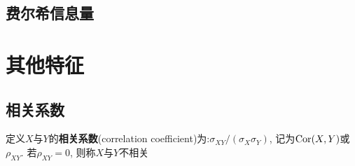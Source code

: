 \subsection{费尔希信息量}



\section{其他特征}

\subsection{相关系数}

\begin{definition}
    定义$X$与$Y$的\textbf{相关系数}(correlation coefficient)为:$\sigma_{XY}/(\sigma_{X}\sigma_{Y})$, 记为$\operatorname{Cor}(X,Y)$或$\rho_{XY}$. 若$\rho_{XY}=0$, 则称$X$与$Y$不相关
\end{definition}

